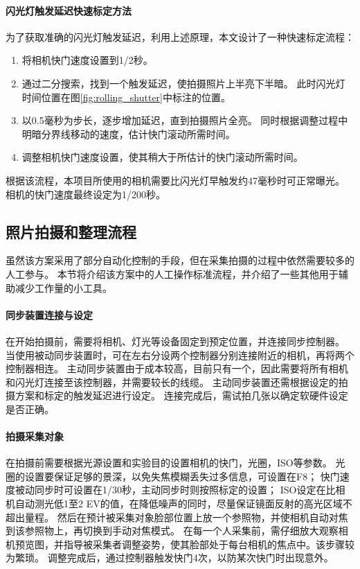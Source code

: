 \paragraph{闪光灯触发延迟快速标定方法}
为了获取准确的闪光灯触发延迟，利用上述原理，本文设计了一种快速标定流程：
\begin{enumerate}
\item 将相机快门速度设置到1/2秒。
\item 通过二分搜索，找到一个触发延迟，使拍摄照片上半亮下半暗。
此时闪光灯时间位置在图\ref{fig:rolling_shutter}中标注的位置。
\item 以0.5毫秒为步长，逐步增加延迟，直到拍摄照片全亮。
同时根据调整过程中明暗分界线移动的速度，估计快门滚动所需时间。
\item 调整相机快门速度设置，使其稍大于所估计的快门滚动所需时间。
\end{enumerate}
根据该流程，本项目所使用的相机需要比闪光灯早触发约47毫秒时可正常曝光。
相机的快门速度最终设定为1/200秒。

\subsection{照片拍摄和整理流程}

虽然该方案采用了部分自动化控制的手段，但在采集拍摄的过程中依然需要较多的人工参与。
本节将介绍该方案中的人工操作标准流程，并介绍了一些其他用于辅助减少工作量的小工具。

\paragraph{同步装置连接与设定}
在开始拍摄前，需要将相机、灯光等设备固定到预定位置，并连接同步控制器。
当使用被动同步装置时，可在左右分设两个控制器分别连接附近的相机，再将两个控制器相连。
主动同步装置由于成本较高，目前只有一个，因此需要将所有相机和闪光灯连接至该控制器，并需要较长的线缆。
主动同步装置还需根据设定的拍摄方案和标定的触发延迟进行设定。
连接完成后，需试拍几张以确定软硬件设定是否正确。

\paragraph{拍摄采集对象}
在拍摄前需要根据光源设置和实验目的设置相机的快门，光圈，ISO等参数。
光圈的设置要保证足够的景深，以免失焦模糊丢失过多信息，可设置在F8；
快门速度被动同步时可设置在1/30秒，主动同步时则按照标定的设置；
ISO设定在比相机自动测光低1至2 EV的值，在降低噪声的同时，尽量保证镜面反射的高光区域不超出量程。
然后在预计被采集对象脸部位置上放一个参照物，并使相机自动对焦到该参照物上，再切换到手动对焦模式。
在每一个人采集前，需仔细放大观察相机预览图，并指导被采集者调整姿势，使其脸部处于每台相机的焦点中。该步骤较为繁琐。
调整完成后，通过控制器触发快门4次，以防某次快门时出现意外。

